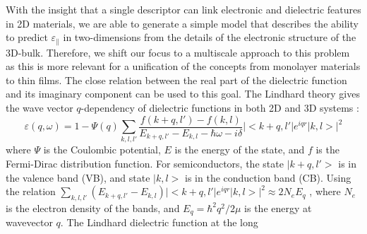 \documentclass[journal=ancac3,manuscript=article,email=true,hyperref=true,keywords=true]{achemso}
\begin{document}
With the insight that a single descriptor can link electronic and dielectric features in 2D materials, 
we are able to generate a simple model that describes the ability 
to predict \(\varepsilon_{\parallel}\) in two-dimensions from the details 
of the electronic structure of the 3D-bulk. Therefore, we shift our focus to a 
multiscale approach to this problem as this is more relevant for a 
unification of the concepts from monolayer materials to thin films. 
The close relation between the real part of the dielectric function 
and its imaginary component can be used to this goal. 
The Lindhard theory gives the wave vector \(q\)-dependency of dielectric
functions in both 2D and 3D systems \cite{Dressel:2002aa}:
%
%
%
%
%
%
%
\begin{equation}
\label{eq:Lindhard-all}
\varepsilon(q, \omega) =  1 - \Psi(q) \sum_{k, l, l'} \frac{f(k+q, l') - f(k, l)}{E_{k+q, l'} - E_{k, l} -
                                         \hbar \omega - i\delta} |<k+q,l'|e^{iqr}|k, l>|^{2}   
\end{equation}
%
%
%
where \(\Psi\) is the Coulombic potential, \(E\) is the energy of the
state, and \(f\) is the Fermi-Dirac distribution function. For
semiconductors, the state $| k+q,l'>$ is in the valence band (VB), and state $|k, l>$ is
in the conduction band (CB). Using the relation \(\sum_{k,l,l'} (E_{k+q, l'} - E_{k,l})
\vert <k+q, l' \vert e^{iqr} \vert k, l > \vert ^{2} \approx 2 N_{e}
E_{q}\) \cite{Slyom_2008_fundBook}, where \(N_{e}\) is the electron density
of the bands, and \(E_{q}=\hbar^{2} q^{2} / 2 \mu\) is the energy at
wavevector \(q\). The Lindhard dielectric function at the long
\end{document}
